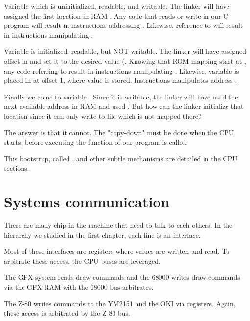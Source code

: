 
Variable  which is uninitialized, readable, and writable. The linker will have assigned the first location in RAM . Any code that reads or write  in our C program will result in instructions addressing . Likewise, reference to  will result in instructions manipulating .

Variable   is initialized, readable, but NOT writable. The linker will have assigned offset  in  and set it to the desired value (. Knowing that ROM mapping start at , any code referring to  result in instructions manipulating . Likewise, variable  is placed in  at offset 1, where value  is stored. Instructions manipulates address .

Finally we come to variable . Since it is writable, the linker will have used the next available address in RAM and used . But how can the linker initialize that location since it can only write to file  which is not mapped there? 

The answer is that it cannot. The "copy-down" must be done when the CPU starts, before executing the  function of our program is called. 

This bootstrap, called , and other subtle mechanisms are detailed in the CPU sections.





\section{Systems communication}

There are many chip in the machine that need to talk to each others. In the hierarchy we studied in the first chapter, each line is an interface. 


Most of these interfaces are registers where values are written and read. To arbitrate these access, the CPU buses are leveraged.

The GFX system reads draw commands and the 68000 writes draw commands via the GFX RAM with the 68000 bus arbitrates.

The Z-80 writes commands to the YM2151 and the OKI via registers. Again, these access is arbitrated by the Z-80 bus.

